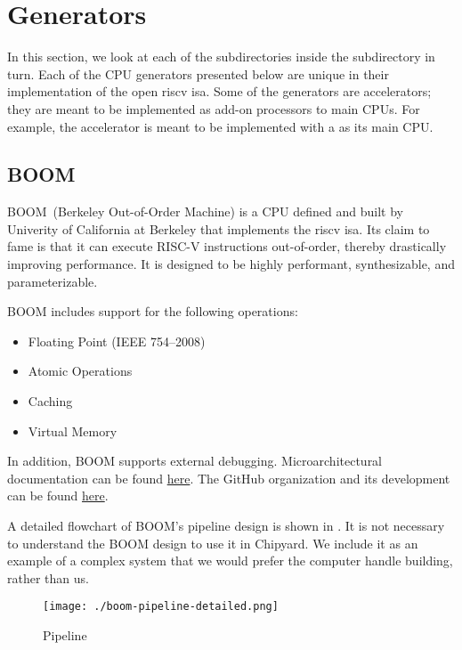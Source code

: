 \section{Generators}\label{sec:Generators}
In this section, we look at each of the subdirectories inside the  subdirectory in turn.
Each of the CPU generators presented below are unique in their implementation of the open \Gls{riscv} \Gls{isa}.\@
Some of the generators are \glspl{accelerator}; they are meant to be implemented as add-on processors to main CPUs.
For example, the  \gls{accelerator} is meant to be implemented with a  as its main CPU.\@

\subsection{BOOM}\label{sec:BOOM_Generator}
\nocite{boomHomepage}
\nocite{boomGithub}
\nocite{boomPaper}
BOOM~(Berkeley Out-of-Order Machine) is a CPU defined and built by Univerity of California at Berkeley that implements the \Gls{riscv} \Gls{isa}.
Its claim to fame is that it can execute RISC-V instructions out-of-order, thereby drastically improving performance.
It is designed to be highly performant, synthesizable, and parameterizable.

BOOM includes support for the following operations:
\begin{itemize}
\item Floating Point (IEEE 754--2008)
\item Atomic Operations
\item Caching
\item Virtual Memory
\end{itemize}
In addition, BOOM supports external debugging.
Microarchitectural documentation can be found \href{https://docs.boom-core.org/en/latest/}{here}.
The GitHub organization and its development can be found \href{https://github.com/riscv-boom}{here}.

A detailed flowchart of BOOM's pipeline design is shown in .
It is not necessary to understand the BOOM design to use it in Chipyard.
We include it as an example of a complex system that we would prefer the computer handle building, rather than us.

\begin{figure}[h!tbp]
  \centering
  \texttt{[image: ./boom-pipeline-detailed.png]}
  \caption{ Pipeline~\cite{boomPaper}}
  \label{fig:BOOM_Pipeline}
\end{figure}

